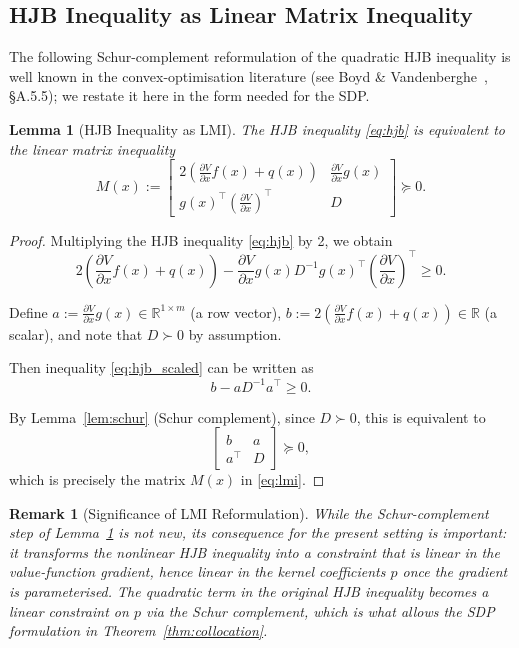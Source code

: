 \documentclass[11pt]{article}
\newtheorem{lemma}[theorem]{Lemma}
\newtheorem{remark}[theorem]{Remark}
\newcommand{\real}{\mathbb{R}}
\begin{document}
\subsection{HJB Inequality as Linear Matrix Inequality}

The following Schur-complement reformulation of the quadratic HJB inequality is well known in the convex-optimisation literature (see Boyd \& Vandenberghe~\cite{boyd_cvxbook}, \S A.5.5); we restate it here in the form needed for the SDP.

\begin{lemma}[HJB Inequality as LMI]
\label{thm:hjb_lmi}
The HJB inequality \eqref{eq:hjb} is equivalent to the linear matrix inequality
\begin{equation}
M(x) := \begin{bmatrix}
2\left(\frac{\partial V}{\partial x}f(x) + q(x)\right) & \frac{\partial V}{\partial x}g(x) \\
g(x)^\top\left(\frac{\partial V}{\partial x}\right)^\top & D
\end{bmatrix} \succeq 0.
\label{eq:lmi}
\end{equation}
\end{lemma}

\begin{proof}
Multiplying the HJB inequality \eqref{eq:hjb} by 2, we obtain
\begin{equation}
2\left(\frac{\partial V}{\partial x}f(x) + q(x)\right) - \frac{\partial V}{\partial x}g(x)D^{-1}g(x)^\top\left(\frac{\partial V}{\partial x}\right)^\top \geq 0.
\label{eq:hjb_scaled}
\end{equation}

Define $a := \frac{\partial V}{\partial x}g(x) \in \real^{1 \times m}$ (a row vector), $b := 2\left(\frac{\partial V}{\partial x}f(x) + q(x)\right) \in \real$ (a scalar), and note that $D \succ 0$ by assumption.

Then inequality \eqref{eq:hjb_scaled} can be written as
\[
b - aD^{-1}a^\top \geq 0.
\]

By Lemma~\ref{lem:schur} (Schur complement), since $D \succ 0$, this is equivalent to
\[
\begin{bmatrix} b & a \\ a^\top & D \end{bmatrix} \succeq 0,
\]
which is precisely the matrix $M(x)$ in \eqref{eq:lmi}.
\end{proof}

\begin{remark}[Significance of LMI Reformulation]
While the Schur-complement step of Lemma~\ref{thm:hjb_lmi} is not new, its consequence for the present setting is important: it transforms the nonlinear HJB inequality into a constraint that is \emph{linear} in the value-function gradient, hence linear in the kernel coefficients $p$ once the gradient is parameterised. The quadratic term in the original HJB inequality becomes a linear constraint on $p$ via the Schur complement, which is what allows the SDP formulation in Theorem~\ref{thm:collocation}.
\end{remark}
\end{document}
